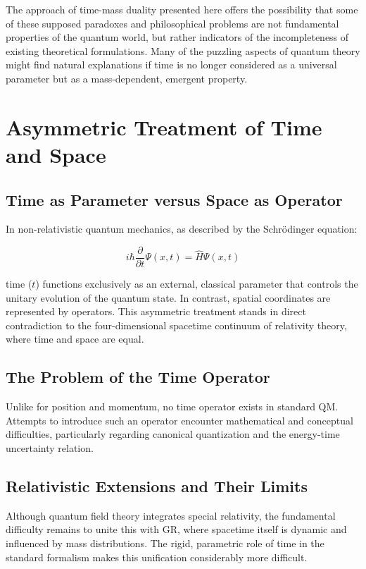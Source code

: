 \documentclass[12pt,a4paper]{article}  %
\begin{document}
	The approach of time-mass duality presented here offers the possibility that some of these supposed paradoxes and philosophical problems are not fundamental properties of the quantum world, but rather indicators of the incompleteness of existing theoretical formulations. Many of the puzzling aspects of quantum theory might find natural explanations if time is no longer considered as a universal parameter but as a mass-dependent, emergent property.
	
	\section{Asymmetric Treatment of Time and Space}
	
	\subsection{Time as Parameter versus Space as Operator}
	
	In non-relativistic quantum mechanics, as described by the Schrödinger equation:
	
	\begin{equation}
		i\hbar \frac{\partial}{\partial t}\Psi(x,t) = \hat{H}\Psi(x,t)
	\end{equation}
	
	time ($t$) functions exclusively as an external, classical parameter that controls the unitary evolution of the quantum state. In contrast, spatial coordinates are represented by operators. This asymmetric treatment stands in direct contradiction to the four-dimensional spacetime continuum of relativity theory, where time and space are equal.
	
	\subsection{The Problem of the Time Operator}
	
	Unlike for position and momentum, no time operator exists in standard QM. Attempts to introduce such an operator encounter mathematical and conceptual difficulties, particularly regarding canonical quantization and the energy-time uncertainty relation.
	
	\subsection{Relativistic Extensions and Their Limits}
	
	Although quantum field theory integrates special relativity, the fundamental difficulty remains to unite this with GR, where spacetime itself is dynamic and influenced by mass distributions. The rigid, parametric role of time in the standard formalism makes this unification considerably more difficult.
	
\end{document}
